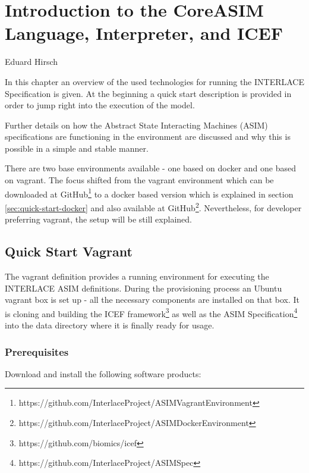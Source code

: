 \chapter{Introduction to the CoreASIM Language, Interpreter, and ICEF}
\label{ch:CoreAsimIntro}

\vspace{-1cm}
\begin{center}
Eduard Hirsch
\end{center}

In this chapter an overview of the used technologies for running the INTERLACE Specification is given. At the beginning a quick start description is provided in order to jump right into the execution of the model.

Further details on how the Abstract State Interacting Machines (ASIM) specifications are functioning in the environment are discussed and why this is possible in a simple and stable manner.

There are two base environments available - one based on docker and one based on vagrant. The focus shifted from the vagrant environment which can be downloaded at GitHub\footnote{https://github.com/InterlaceProject/ASIMVagrantEnvironment} to a docker based version which is explained in section \ref{sec:quick-start-docker} and also available at GitHub\footnote{https://github.com/InterlaceProject/ASIMDockerEnvironment}. Nevertheless, for developer preferring vagrant, the setup will be still explained.

\section{Quick Start Vagrant}
\label{sec:quick-start-vagrant}

The vagrant definition provides a running environment for executing the INTERLACE ASIM definitions. During the provisioning process an Ubuntu vagrant box is set up - all the necessary components are installed on that box. It is cloning and building the ICEF framework\footnote{https://github.com/biomics/icef} as well as the ASIM Specification\footnote{https://github.com/InterlaceProject/ASIMSpec} into the data directory where it is finally ready for usage.

\subsection{Prerequisites}

Download and install the following software products:

